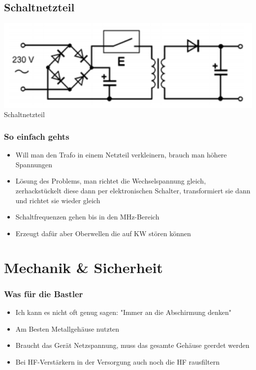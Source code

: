 \subsection*{Schaltnetzteil}
\begin{frame}
    \begin{center}
        \includegraphics[width=1\textwidth]{a17/TD317.png}\\
       Schaltnetzteil \cite{bna}
    \end{center}
\end{frame}

\begin{frame}
\frametitle{So einfach gehts}
\begin{itemize}
	\item	Will man den Trafo in einem Netzteil verkleinern, brauch man höhere Spannungen
	\item	Lösung des Problems, man richtet die Wechselspannung gleich, zerhackstückelt diese dann per elektronischen Schalter, transformiert sie dann und richtet sie wieder gleich
	\item	Schaltfrequenzen gehen bis in den MHz-Bereich
	\item	Erzeugt dafür aber Oberwellen die auf KW stören können
\end{itemize}
\end{frame}

\section*{Mechanik \& Sicherheit}
\begin{frame}
\frametitle{Was für die Bastler}
\begin{itemize}
	\item	Ich kann es nicht oft genug sagen: "Immer an die Abschirmung denken"
	\item	Am Besten Metallgehäuse nutzten
	\item	Braucht das Gerät Netzspannung, muss das gesamte Gehäuse geerdet werden
	\item	Bei HF-Verstärkern in der Versorgung auch noch die HF rausfiltern
\end{itemize}
\end{frame}

